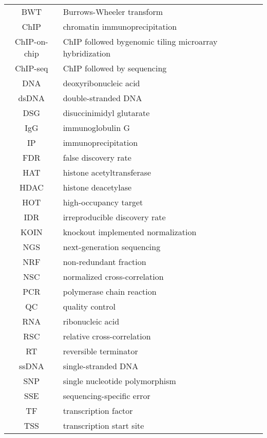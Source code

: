 \documentclass[12pt,a4paper]{report}
\begin{document}



\tableofcontents


\begin{tabular}{c l}
	BWT & Burrows-Wheeler transform \\
	
	ChIP & chromatin immunoprecipitation \\
	ChIP-on-chip & ChIP followed bygenomic tiling microarray hybridization \\
	ChIP-seq & ChIP followed by sequencing \\
	DNA & deoxyribonucleic acid \\
	dsDNA & double-stranded DNA \\
	DSG & disuccinimidyl glutarate \\
	IgG & immunoglobulin G \\
	IP & immunoprecipitation \\
	FDR & false discovery rate \\
	
	
	HAT & histone acetyltransferase \\
	HDAC & histone deacetylase \\
	HOT & high-occupancy target \\

	IDR & irreproducible discovery rate \\

	KOIN & knockout implemented normalization \\

	NGS & next-generation sequencing \\
	NRF & non-redundant fraction \\
	NSC & normalized cross-correlation \\
	PCR & polymerase chain reaction \\
	QC & quality control \\

	RNA & ribonucleic acid \\
	RSC & relative cross-correlation \\
	RT & reversible terminator \\
	
	
	ssDNA & single-stranded DNA \\
	SNP & single nucleotide polymorphism \\
	SSE & sequencing-specific error \\
	TF & transcription factor \\
	TSS & transcription start site \\
	
	
	
\end{tabular}
\end{document}
